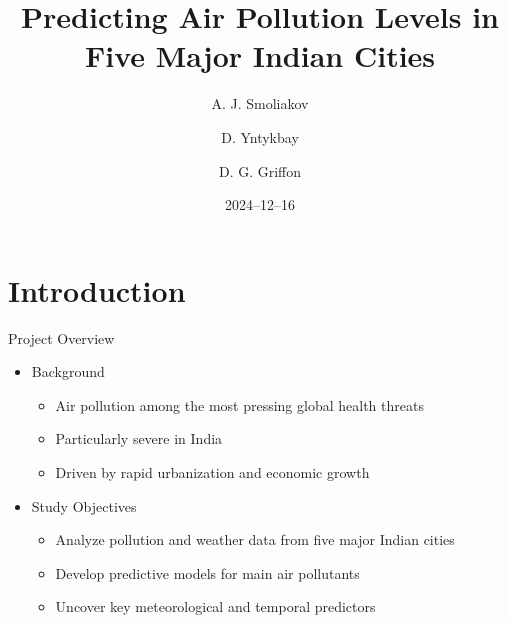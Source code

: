 \documentclass[svgnames, 12pt]{beamer}
\title[Air Pollution in India]{Predicting Air Pollution Levels in Five Major Indian Cities}
\author{A. J. Smoliakov \and D. Yntykbay \and D. G. Griffon}
\institute[VU]{Data Science Study Programme\\Faculty of Mathematics and Informatics}
\date{2024--12--16}
\begin{document}
\begin{frame}
\titlepage
\end{frame}


\section{Introduction}

\begin{frame}{Project Overview}
    \begin{itemize}
        \item Background
            \begin{itemize}
                \item Air pollution among the most pressing global health threats
                \item Particularly severe in India
                \item Driven by rapid urbanization and economic growth
            \end{itemize}
        \vspace{1em}
        \item Study Objectives
            \begin{itemize}
                \item Analyze pollution and weather data from five major Indian cities
                \item Develop predictive models for main air pollutants
                \item Uncover key meteorological and temporal predictors
            \end{itemize}
    \end{itemize}
    \vfill
 \end{frame}
\end{document}
